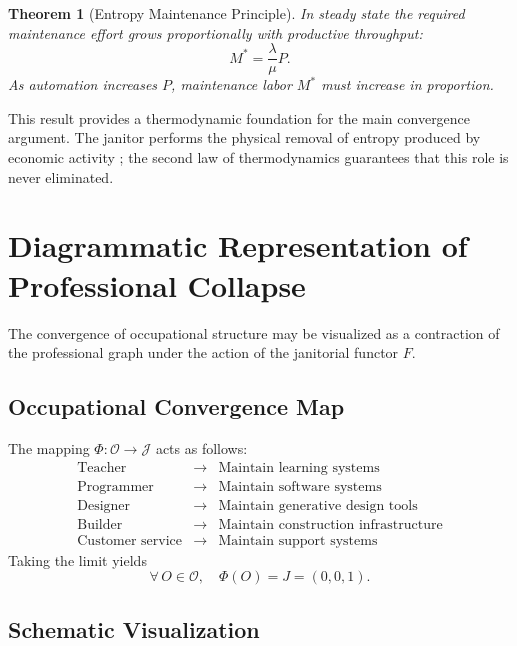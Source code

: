 \documentclass[12pt,a4paper]{article}
\theoremstyle{plain}
\newtheorem{theorem}{Theorem}[section]
\theoremstyle{definition}
\theoremstyle{remark}
\begin{document}
\begin{theorem}[Entropy Maintenance Principle]
\label{thm:entropy}
In steady state the required maintenance effort grows proportionally with
productive throughput:
\[
M^* = \frac{\lambda}{\mu} P.
\]
As automation increases $P$, maintenance labor $M^*$ must increase in
proportion.
\end{theorem}

This result provides a thermodynamic foundation for the main convergence
argument.  The janitor performs the physical removal of entropy produced by
economic activity \cite{georgescuroegen1971}; the second law of thermodynamics guarantees that this role
is never eliminated.

\section{Diagrammatic Representation of Professional Collapse}
\label{app:diagram}

The convergence of occupational structure may be visualized as a contraction
of the professional graph under the action of the janitorial functor $F$.

\subsection{Occupational Convergence Map}

The mapping $\Phi : \mathcal{O} \to \mathcal{J}$ acts as follows:
\[
\begin{array}{rcl}
\text{Teacher} & \longrightarrow & \text{Maintain learning systems}\\
\text{Programmer} & \longrightarrow & \text{Maintain software systems}\\
\text{Designer} & \longrightarrow & \text{Maintain generative design tools}\\
\text{Builder} & \longrightarrow & \text{Maintain construction infrastructure}\\
\text{Customer service} & \longrightarrow & \text{Maintain support systems}
\end{array}
\]
Taking the limit yields
\[
\forall\, O \in \mathcal{O}, \quad \Phi(O) = J = (0,0,1).
\]

\subsection{Schematic Visualization}
\end{document}
